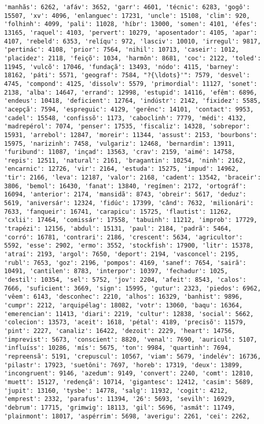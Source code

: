 \begin{Verbatim}[commandchars=\\\{\}]
'manhãs': 6262, 'afáv': 3652, 'garr': 4601, 'técnic': 6283, 'gogô': 15507, 'xv': 4096, 'enlanguec': 17231, 'uncle': 15108, 'clim': 920, 'folhinh': 4099, 'pali': 11028, 'híbr': 13000, 'somen': 4101, 'éfes': 13165, 'raquel': 4103, 'pervert': 10279, 'aposentador': 4105, 'apar': 4107, 'rebeld': 6353, 'relíqu': 972, 'lasciv': 10010, 'irregul': 9817, 'pertinác': 4108, 'prior': 7564, 'nihil': 10713, 'caseir': 1012, 'placidez': 2118, 'feiçõ': 1034, 'harmôn': 8681, 'coc': 2122, 'toled': 11945, 'vulcõ': 17046, 'fundaçã': 13493, 'nódo': 4115, 'barney': 18162, 'páti': 5571, 'geograf': 7584, "?{\ldots}'": 7579, 'desvel': 4745, 'compond': 4125, 'dissolv': 5579, 'primordial': 11127, 'sonet': 2138, 'alba': 14647, 'errand': 12998, 'estupid': 14116, 'efêm': 6896, 'endeus': 10418, 'deficient': 12764, 'indústr': 2142, 'fixidez': 5585, 'acepçã': 7594, 'espreguic': 4129, 'gerênc': 14101, 'contact': 9953, 'cadel': 15548, 'confissõ': 1173, 'caboclinh': 7779, 'médi': 4132, 'madrepérol': 7074, 'penser': 17535, 'fiscaliz': 14328, 'sobrepor': 15931, 'arrebol': 12847, 'moreir': 11344, 'assust': 2153, 'bourbons': 15975, 'narizinh': 7458, 'vulgariz': 12468, 'bernardim': 13911, 'furibund': 11087, 'inçad': 13563, 'crav': 2159, 'aimé': 14758, 'repis': 12511, 'natural': 2161, 'bragantin': 10254, 'ninh': 2162, 'encarnic': 12726, 'vir': 2164, 'estuda': 15275, 'impud': 14962, 'tir': 2166, 'leva': 12187, 'valor': 2168, 'cadent': 13542, 'braceir': 3806, 'bemol': 16430, 'fanat': 13840, 'regímen': 2172, 'ortográf': 16094, 'anterior': 2174, 'mansidã': 8743, 'obreir': 5617, 'deduz': 5619, 'aniversár': 12324, 'fidúc': 17399, 'când': 7632, 'milionári': 7633, 'fanqueir': 16741, 'carapicu': 15725, 'flautist': 11262, 'cxlii': 17464, 'comissár': 17558, 'tabuinh': 11212, 'improb': 17729, 'trapézi': 12156, 'abdul': 15131, 'paul': 2184, 'padrã': 5464, 'corró': 16781, 'contrari': 2186, 'crescent': 5634, 'agricultor': 5592, 'esse': 2902, 'ermo': 3552, 'stockfish': 17900, 'litr': 15378, 'atraí': 2193, 'argol': 7650, 'deport': 2194, 'vasconcel': 2195, 'rubl': 7653, 'goz': 2196, 'pompos': 4169, 'sanef': 7654, 'sairã': 10491, 'cantilen': 8783, 'interpor': 10397, 'fechadur': 1025, 'destil': 10354, 'sel': 5752, 'jov': 2204, 'afeit': 8543, 'calos': 7666, 'suficient': 3669, 'sign': 15995, 'gutur': 2323, 'piedos': 6962, 'vêem': 6143, 'desconhec': 2210, 'alhos': 16329, 'banhist': 9896, 'cumpr': 2212, 'arquipélag': 18082, 'votr': 13060, 'baqu': 16364, 'emerencian': 11413, 'diari': 2219, 'cultur': 12838, 'social': 5662, 'colecion': 13573, 'aceit': 1618, 'pétal': 4189, 'precisõ': 11579, 'pint': 2227, 'canaliz': 16422, 'dezoit': 2229, 'heart': 14756, 'imprevist': 5673, 'conscient': 8820, 'venal': 7690, 'auricul': 5107, 'influíss': 10286, 'mís': 5675, 'ton': 9984, 'quartinh': 7694, 'repreensã': 5191, 'crepuscul': 10567, 'viam': 5679, 'indelév': 16736, 'pilastr': 17923, 'suetôni': 7697, 'horeb': 17319, 'deux': 13899, 'incongruent': 9146, 'azedum': 9149, 'convert': 2240, 'comt': 12810, 'muett': 15127, 'redençã': 10714, 'gigantesc': 12412, 'casim': 5689, 'jupit': 13160, 'tysbe': 14778, 'salg': 11932, 'cogit': 4212, 'emprest': 2332, 'parafus': 11394, '26': 5693, 'sevilh': 16929, 'debrum': 17715, 'grimwig': 18113, 'gil': 5696, 'asmát': 11749, 'plainmont': 18017, 'aspérrim': 5698, 'averigu': 2261, 'cei': 2262, 
\end{Verbatim}
